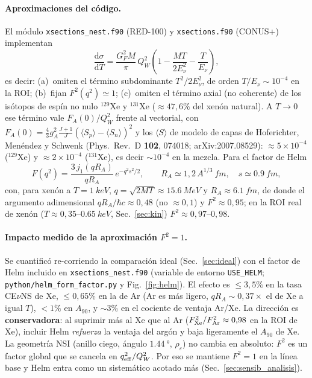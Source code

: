 \documentclass[11pt,a4paper]{article}
\newcommand{\eps}{\varepsilon}
\newcommand{\QW}{Q_{W}}
\newcommand{\Enu}{E_{\nu}}
\newcommand{\Tnr}{T}
\newcommand{\qeff}{q_{\rm eff}}
\newcommand{\code}[1]{\texttt{#1}}
\newcommand{\dd}{\mathrm{d}}
\begin{document}
\paragraph{Aproximaciones del c\'odigo.} El m\'odulo \code{xsections\_nest.f90}
(RED-100) y \code{xsections.f90} (CONUS+) implementan
\begin{equation}
  \label{eq:dsigma_code}
  \frac{\dd\sigma}{\dd \Tnr}
  = \frac{G_{F}^{2} M}{\pi}\,\QW^{2}
    \left(1 - \frac{M\Tnr}{2\Enu^{2}} - \frac{\Tnr}{\Enu}\right),
\end{equation}
es decir: (a)~omiten el t\'ermino subdominante $\Tnr^{2}/2\Enu^{2}$, de orden
$\Tnr/\Enu\sim 10^{-4}$ en la ROI; (b)~fijan $F^{2}(q^{2})\simeq 1$;
(c)~omiten el t\'ermino axial (no coherente) de los is\'otopos de esp\'in no nulo
$^{129}$Xe y $^{131}$Xe ($\approx47{,}6\%$ del xen\'on natural). A $\Tnr\to0$ ese
t\'ermino vale $F_{A}(0)/\QW^{2}$ frente al vectorial, con
$F_{A}(0)=\tfrac{4}{3}g_{A}^{2}\tfrac{J+1}{J}(\langle S_{p}\rangle-\langle S_{n}\rangle)^{2}$
y los $\langle S\rangle$ de modelo de capas de Hoferichter, Men\'endez y Schwenk
(Phys.\ Rev.\ D \textbf{102}, 074018; arXiv:2007.08529): $\approx5\times10^{-4}$
($^{129}$Xe) y $\approx2\times10^{-4}$ ($^{131}$Xe), es decir $\sim10^{-4}$ en la
mezcla. Para el factor de Helm
\begin{equation}
  \label{eq:helm}
  F(q^{2}) = \frac{3\,j_{1}(qR_{A})}{qR_{A}}\,
             e^{-q^{2}s^{2}/2},
  \qquad
  R_{A} \simeq 1{,}2\,A^{1/3}\ \si{fm},\quad s\simeq\SI{0.9}{fm},
\end{equation}
con, para xen\'on a $\Tnr=\SI{1}{keV}$, $q=\sqrt{2M\Tnr}\approx\SI{15.6}{MeV}$ y
$R_{A}\approx\SI{6.1}{fm}$, de donde el argumento adimensional
$qR_{A}/\hbar c\approx 0{,}48$ (no $\approx0{,}1$) y $F^{2}\approx 0{,}95$; en la
ROI real de xen\'on ($\Tnr\approx0{,}35$--$\SI{0.65}{keV}$, Sec.~\ref{sec:kin})
$F^{2}\approx0{,}97$--$0{,}98$.

\paragraph{Impacto medido de la aproximaci\'on $F^{2}=1$.} Se cuantific\'o
re-corriendo la comparaci\'on ideal (Sec.~\ref{sec:ideal}) con el factor de Helm
incluido en \code{xsections\_nest.f90} (variable de entorno \code{USE\_HELM};
\code{python/helm\_form\_factor.py} y Fig.~\ref{fig:helm}). El efecto es
$\le 3{,}5\%$ en la tasa CE$\nu$NS de Xe, $\le 0{,}65\%$ en la de Ar (Ar es m\'as
ligero, $qR_{A}\!\sim\!0{,}37\times$ el de Xe a igual $\Tnr$), $<1\%$ en $A_{90}$,
y $\sim 3\%$ en el cociente de ventaja Ar/Xe. La direcci\'on es
\textbf{conservadora}: al suprimir m\'as al Xe que al Ar
($F^{2}_{\rm Xe}/F^{2}_{\rm Ar}\approx0{,}98$ en la ROI de Xe), incluir Helm
\emph{refuerza} la ventaja del arg\'on y baja ligeramente el $A_{90}$ de Xe. La
geometr\'ia NSI (anillo ciego, \'angulo $\SI{1.44}{\degree}$, $\rho_{\eps}$) no
cambia en absoluto: $F^{2}$ es un factor global que se cancela en
$\qeff^{2}/\QW^{2}$. Por eso se mantiene $F^{2}=1$ en la l\'inea base y Helm entra
como un sistem\'atico acotado m\'as (Sec.~\ref{sec:sensib_analisis}).
\end{document}
